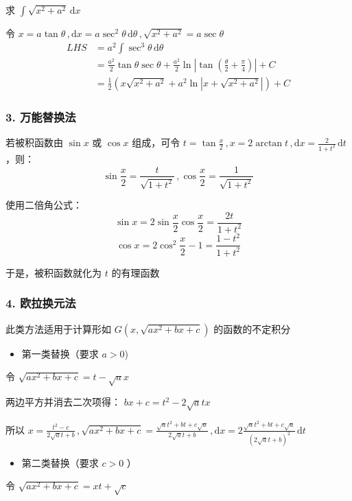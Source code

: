 \begin{example}{}
求 $\displaystyle{\int\sqrt{x^2+a^2}\,\mathrm{d}x}$

令 $x=a\tan \theta\,,\mathrm{d}x=a\sec^2\theta\,\mathrm{d}\theta\,,\sqrt{x^2+a^2}=a\sec\theta$
\begin{equation}
\begin{aligned}
LHS&=a^2\int \sec^3\theta\,\mathrm{d}\theta\\ &=\frac{a^2}{2}\tan\theta\sec\theta+\frac{a^2}{2}\ln\left|\tan\left(\frac{\theta}{2}+\frac{\pi}{4}\right)\right|+C\\ &=\frac{1}{2}\left(x\sqrt{x^2+a^2}+a^2\ln\left|x+\sqrt{x^2+a^2}\right|\right)+C
\end{aligned}
\end{equation}

\end{example}
\subsubsection{3. 万能替换法}
若被积函数由 $\sin x$ 或 $\cos x$ 组成，可令 $\displaystyle{t=\tan\frac{x}{2}\,,x=2\arctan t\,,\mathrm{d}x=\frac{2}{1+t^2}\,\mathrm{d}t}$ ，则：
$$\sin\frac{x}{2}=\frac{t}{\sqrt{1+t^2}}\,,\cos \frac{x}{2}=\frac{1}{\sqrt{1+t^2}}$$

使用二倍角公式：
$$\sin x=2\sin\frac{x}{2}\cos\frac{x}{2}=\frac{2t}{1+t^2}$$ $$ \cos x=2\cos^2\frac{x}{2}-1=\frac{1-t^2}{1+t^2} $$

于是，被积函数就化为 $t$ 的有理函数
\subsubsection{4. 欧拉换元法}
此类方法适用于计算形如 $\displaystyle{G\left(x,\sqrt{ax^2+bx+c}\right)}$ 的函数的不定积分

\begin{itemize}
\item 第一类替换（要求 $a>0$)
\end{itemize}
令 $\sqrt{ax^2+bx+c}=t-\sqrt{a}x$

两边平方并消去二次项得： $bx+c=t^2-2\sqrt{a}tx$

所以 $\displaystyle{x=\frac{t^2-c}{2\sqrt{a}t+b}\,,\sqrt{ax^2+bx+c}=\frac{\sqrt{a}t^2+bt+c\sqrt{a}}{2\sqrt{a}t+b}\,,\mathrm{d}x=2\frac{\sqrt{a}t^2+bt+c\sqrt{a}}{(2\sqrt{a}t+b)^2}\,\mathrm{d}t}$

\begin{itemize}
\item 第二类替换（要求 $c>0$ ）
\end{itemize}
令 $\displaystyle{\sqrt{ax^2+bx+c}=xt+\sqrt{c}}$

